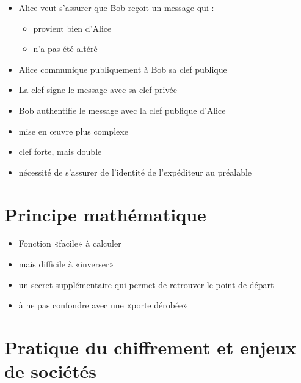 \documentclass[french]{article}
\begin{document}
  \begin{multicols}{2}
      \begin{itemize}
        \item Alice veut s'assurer que Bob reçoit un message qui :
          \begin{itemize}
            \item provient bien d'Alice
            \item n'a pas été altéré
          \end{itemize}
        \item Alice communique publiquement à Bob sa clef publique
        \item La clef signe le message avec sa clef privée
        \item Bob authentifie le message avec la clef publique d'Alice
      \end{itemize}
      \begin{itemize}
        \item mise en œuvre plus complexe
        \item clef forte, mais double
        \item nécessité de s'assurer de l'identité de l'expéditeur au
          préalable
      \end{itemize}
  \end{multicols}

\section{Principe mathématique}
  \begin{multicols}{2}
      \begin{itemize}
        \item Fonction «facile» à calculer
        \item mais difficile à «inverser»
      \end{itemize}
    \columnbreak
      \begin{itemize}
        \item un secret supplémentaire qui permet de retrouver le point
          de départ
        \item à ne pas confondre avec une «porte dérobée»
      \end{itemize}
  \end{multicols}

\section{Pratique du chiffrement et enjeux de sociétés}
\end{document}
